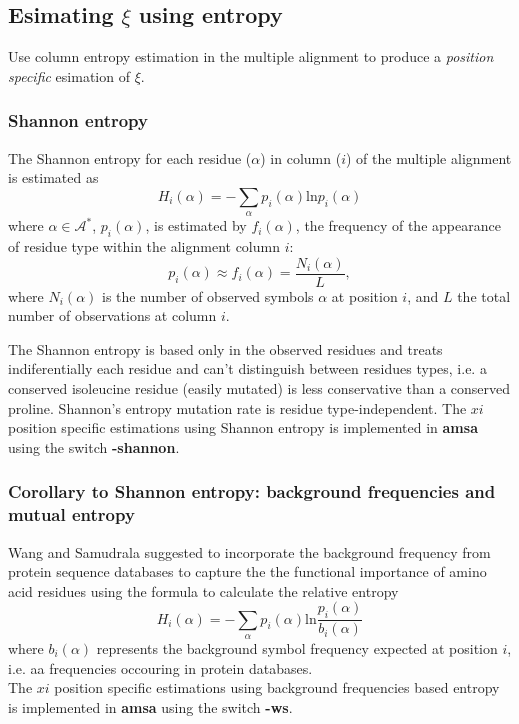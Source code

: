 \documentclass[a4paper,10pt,twoside]{scrartcl}
\begin{document}
\subsection{Esimating $\xi$ using entropy}
Use column entropy estimation in the multiple alignment to produce a {\em position specific} esimation of $\xi$.

\subsubsection{Shannon entropy}
The Shannon entropy for each residue ($\alpha$) in column ($i$) of the multiple alignment is estimated as
\begin{equation}
H_i(\alpha) = -\sum_\alpha p_i(\alpha)\mathrm{ln}p_i(\alpha)
\end{equation}
where  $\alpha \in \mathcal{A}^{*}$, $p_i(\alpha)$, is estimated by $f_i(\alpha)$, the frequency of the appearance of residue type within the alignment column $i$:
\begin{equation}
p_i(\alpha) \approx f_i(\alpha) = \frac{N_i(\alpha)}{L},
\end{equation}
where $N_i(\alpha)$ is the number of observed symbols $\alpha$ at position $i$, and $L$ the total number of observations at column $i$.

The Shannon entropy is based only in the observed residues and treats indiferentially each residue and can't distinguish between residues types, i.e. 
a conserved isoleucine residue (easily mutated) is less conservative than a conserved proline.  Shannon's entropy mutation rate is residue type-independent.
The $xi$ position specific estimations using Shannon entropy is implemented in {\bf amsa} using the switch {\bf -shannon}.

\subsubsection{Corollary to Shannon entropy: background frequencies and mutual entropy}

Wang and Samudrala \cite{Wang06} suggested to incorporate the background frequency from protein sequence databases to capture the the functional importance of amino
acid residues using the formula to calculate the relative entropy
\begin{equation}
H_i(\alpha) = -\sum_\alpha p_i(\alpha)\mathrm{ln}\frac{p_i(\alpha)}{b_i(\alpha)}
\end{equation}
where $b_i(\alpha)$ represents the background symbol frequency expected at position $i$, i.e. aa frequencies occouring in protein databases.\\
The $xi$ position specific estimations using background frequencies based entropy is implemented in {\bf amsa} using the switch {\bf -ws}.
\end{document}
